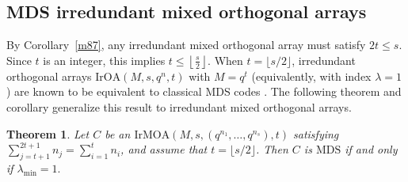 \documentclass[11pt]{article}
\newtheorem{Theorem}{Theorem}[section]
\newtheorem{Definition and Notation}[Theorem]{Definition and Notation}
\begin{document}

\subsection{MDS irredundant mixed orthogonal arrays}

By Corollary~\ref{m87}, any irredundant mixed orthogonal array must satisfy $2t\le s$.  Since $t$ is an integer, this implies $t \le \left\lfloor \frac{s}{2}\right\rfloor .$ When $t=\lfloor s/2\rfloor$, irredundant orthogonal arrays $\mathrm{IrOA}(M,s,q^{n},t)$ with $M=q^t$ (equivalently, with index $\lambda=1$) are known to be equivalent to classical MDS codes \cite{B2019,GALRZ2015}.  The following theorem and corollary generalize this result to irredundant mixed orthogonal arrays.

\begin{Theorem}\label{cor:extreme_cases}
Let $C$ be an $\mathrm{IrMOA}(M,s,(q^{n_1},\dots,q^{n_s}),t)$ satisfying $\sum_{j=t+1}^{2t+1} n_j = \sum_{i=1}^{t} n_i$, and assume that $t=\lfloor s/2\rfloor$. Then $C$ is $\mathrm{MDS}$ if and only if $\lambda_{\min}=1.$
\end{Theorem}
\end{document}
